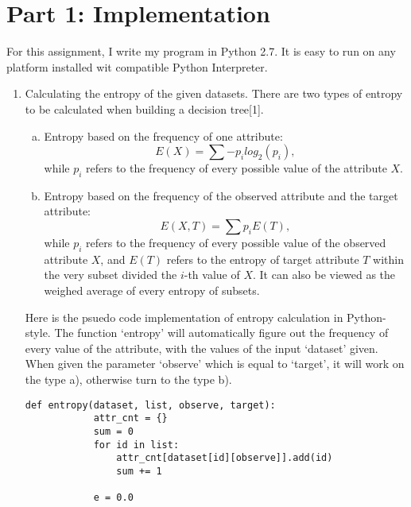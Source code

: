 \documentclass[12pt,letterpaper]{article}
\begin{document}
\section*{Part 1: Implementation}

For this assignment, I write my program in Python 2.7.  It is easy to run on any platform installed wit compatible Python Interpreter.

\begin{enumerate}
  \item
   Calculating the entropy of the given datasets. There are two types of entropy to be calculated when building a decision tree[1].
   \begin{enumerate}[a)]
       \item Entropy based on the frequency of one attribute:
            \begin{equation*}
                E(X) = \sum -p_{i}log_2 (p_{i}),
            \end{equation*}
            while $p_i$ refers to the frequency of every possible value of the attribute $X$.
       \item Entropy based on the frequency of the observed attribute and the target attribute:
            \begin{equation*}
                E(X,T) = \sum p_{i}E(T),
            \end{equation*}
            while $p_i$ refers to the frequency of every possible value of the observed attribute $X$, and $E(T)$ refers to the entropy of target attribute $T$ within the very subset divided the $i$-th value of $X$.  It can also be viewed as the weighed average of every entropy of subsets.
   \end{enumerate}
   
Here is the psuedo code implementation of entropy calculation in Python-style.  The function `entropy' will automatically figure out the frequency of every value of the attribute, with the values of the input `dataset' given.  When given the parameter `observe' which is equal to `target', it will work on the type a), otherwise turn to the type b).
     \begin{lstlisting}[style = Python]
        def entropy(dataset, list, observe, target):
            attr_cnt = {}
            sum = 0
            for id in list:
                attr_cnt[dataset[id][observe]].add(id)
                sum += 1
        
            e = 0.0
        

\end{lstlisting}
\end{enumerate}
\end{document}
